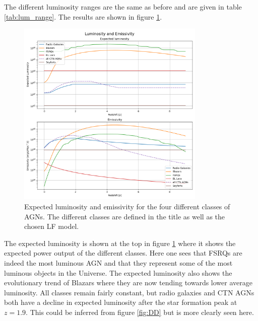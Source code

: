 The different luminosity ranges are the same as before and are given in table \ref{tab:lum_range}. The results are shown in figure \ref{fig:EL}.

\begin{figure}
    \centering
    \includegraphics[width = 0.8\textwidth]{new_plots/Luminosity and Emissivity.png}
    \caption{Expected luminosity and emissivity for the four different classes of AGNs. The different classes are defined in the title as well as the chosen LF model.}
    \label{fig:EL}
\end{figure}



The expected luminosity is shown at the top in figure \ref*{fig:EL} where it shows the expected power output of the different classes. Here one sees that FSRQs are indeed the most luminous AGN and 
that they represent some of the most luminous objects in the Universe.
The expected luminosity also shows the evolutionary trend of Blazars where they are now tending towards lower average luminosity. 
All classes remain fairly constant, but radio galaxies and CTN AGNs both have a decline in expected luminosity after the star formation peak at $z=1.9$. This could be inferred from figure \ref*{fig:DD} but is more clearly seen here.

